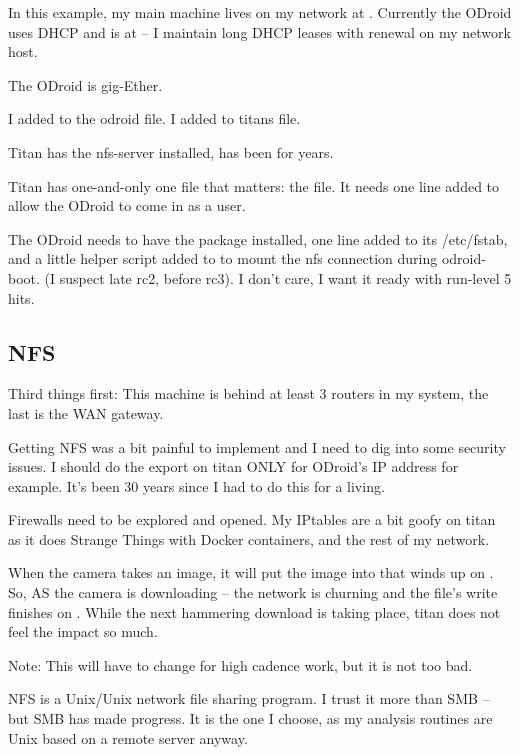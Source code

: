 \documentclass[letter,11pt,oneside]{article}
\newcommand{\dhl}[1]{{\color{verbcolor}{\texttt#1}}}
\begin{document}
In this example, my main machine \dhl{titan} lives on
my network at \dhl{192.168.0.216}. Currently the ODroid
uses DHCP and is at \dhl{192.168.0.218} -- I maintain
long DHCP leases with renewal on my network host.

The ODroid is gig-Ether.

I added \dhl{192.168.0.216} to the odroid \dhl{/etc/hosts} file.
I added \dhl{192.168.0.218}  to titans \dhl{/etc/hosts} file.

Titan has the nfs-server installed, has been for years.

Titan has one-and-only one file that matters: the \dhl{/etc/exports}
file. It needs one line added to allow the ODroid to come in
as a user.

The ODroid needs to have the \dhl{nfs-common} package installed,
one line added to its /etc/fstab, and a little helper script
added to \dhl{/etc/network/if-up.d/fstab} to mount the nfs
connection during odroid-boot. (I suspect late rc2, before rc3).
I don't care, I want it ready with run-level 5 hits.


\subsection{NFS}  \label{sec:nfs}

Third things first: This machine is behind at least 3 routers
in my system, the last is the WAN gateway.

Getting NFS was a bit painful to implement and I need to dig into
some security issues. I should do the export on titan
ONLY for ODroid's IP address for example. It's been 30 years
since I had to do this for a living.

Firewalls need to be explored and opened. My IPtables are a bit goofy
on titan as it does Strange Things\texttrademark\; with Docker
containers, and the rest of my network.

When the camera takes an image, it will put the image into
\dhl{ordoid:/mnt/titantoday} that winds up on
\dhl{titan:/export/wayne/titantoday}. So, AS the camera
is downloading -- the network is churning and the file's write
finishes on \dhl{titan}. While the next hammering download
is taking place, titan does not feel the impact so much.

Note: This will have to change for high cadence work,
but it is not too bad.

NFS is a Unix/Unix network file sharing program. I trust it more than
SMB -- but SMB has made progress. It is the one I choose, as my
analysis routines are Unix based on a remote server anyway.
\end{document}
